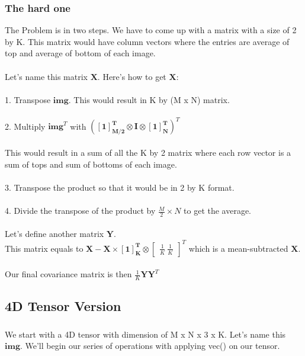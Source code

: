 \documentclass{article}
\newcommand{\matr}[1]{\mathbf{#1}}
\begin{document}
		\subsubsection{The hard one} %
		The Problem is in two steps. We have to come up with a matrix with a size of 2 by K.
		This matrix would have column vectors where the entries are average of top and average of bottom of each image.\\
		\\
		Let's name this matrix $\matr{X}$. Here's how to get $\matr{X}$:\\
		\\
		1. Transpose $\matr{img}$. This would result in K by (M x N) matrix.\\
		\\
		2. Multiply $\matr{img}^{T}$ with $(\matr{[1]^{T}_{M/2}} \otimes \matr{I} \otimes \matr{[1]^{T}_{N}})^{T}$\\
		\\
		This would result in a sum of all the K by 2 matrix where each row vector is a sum of tops and sum of bottoms of each image.\\
		\\
		3. Transpose the product so that it would be in 2 by K format.\\
		\\
		4. Divide the transpose of the product by $\frac{M}{2} \times N$ to get the average.\\
		\\
		Let's define another matrix $\matr{Y}$.  \\
		This matrix equals to $\matr{X} - \matr{X} \times \matr{[1]^{T}_{K}} \otimes  
		\begin{bmatrix}
		{\frac{1}{K} \ \frac{1}{K}}
		\end{bmatrix}^{T}
		$ which is a mean-subtracted $\matr{X}$.\\
		\\
		Our final covariance matrix is then $\frac{1}{K}\matr{Y}\matr{Y}^{T}$

	\subsection{4D Tensor Version} %
		\subsubsection{} %
		We start with a 4D tensor with dimension of M x N x 3 x K. Let's name this $\matr{img}$. 
		We'll begin our series of operations with applying vec() on our tensor.\\
\end{document}
